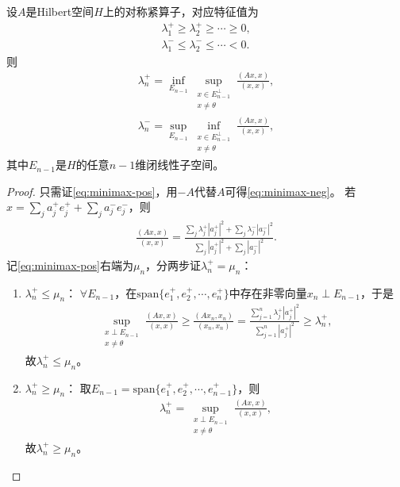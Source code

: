 \documentclass[../../main.tex]{subfiles}%
\begin{document}
\begin{theorem}[极小极大刻画]
设$A$是Hilbert空间$H$上的对称紧算子，对应特征值为
\begin{align*}
\lambda_1^+\geqslant\lambda_2^+\geqslant\cdots\geqslant0,\\
\lambda_1^-\leqslant\lambda_2^-\leqslant\cdots<0.
\end{align*}
则
\begin{align}
\lambda_n^+=\inf_{E_{n-1}}\sup_{\substack{x\in E_{n-1}^\perp\\x\neq\theta}}\frac{(Ax,x)}{(x,x)},\label{eq:minimax-pos}\\
\lambda_n^-=\sup_{E_{n-1}}\inf_{\substack{x\in E_{n-1}^\perp\\x\neq\theta}}\frac{(Ax,x)}{(x,x)},\label{eq:minimax-neg}
\end{align}
其中$E_{n-1}$是$H$的任意$n-1$维闭线性子空间。
\end{theorem}
\begin{proof}
只需证\eqref{eq:minimax-pos}，用$-A$代替$A$可得\eqref{eq:minimax-neg}。
若$\displaystyle x=\sum\limits_{j}a_j^+e_j^++\sum\limits_{j}a_j^-e_j^-$，则
\begin{align*}
\frac{(Ax,x)}{(x,x)}=\frac{\sum\limits_{j}\lambda_j^+|a_j^+|^2+\sum\limits_{j}\lambda_j^-|a_j^-|^2}{\sum\limits_{j}|a_j^+|^2+\sum\limits_{j}|a_j^-|^2}.
\end{align*}
记\eqref{eq:minimax-pos}右端为$\mu_n$，分两步证$\lambda_n^+=\mu_n$：
\begin{enumerate}[(1)]
\item $\lambda_n^+\leqslant\mu_n$：
$\forall E_{n-1}$，在$\mathrm{span}\{e_1^+,e_2^+,\cdots,e_n^+\}$中存在非零向量$x_n\perp E_{n-1}$，于是
\begin{align*}
\sup_{\substack{x\perp E_{n-1}\\x\neq\theta}}\frac{(Ax,x)}{(x,x)}\geqslant\frac{(Ax_n,x_n)}{(x_n,x_n)}=\frac{\sum\limits_{j=1}^{n}\lambda_j^+|a_j^+|^2}{\sum\limits_{j=1}^{n}|a_j^+|^2}\geqslant\lambda_n^+,
\end{align*}
故$\lambda_n^+\leqslant\mu_n$。
\item $\lambda_n^+\geqslant\mu_n$：
取$E_{n-1}=\mathrm{span}\{e_1^+,e_2^+,\cdots,e_{n-1}^+\}$，则
\begin{align*}
\lambda_n^+=\sup_{\substack{x\perp E_{n-1}\\x\neq\theta}}\frac{(Ax,x)}{(x,x)},
\end{align*}
故$\lambda_n^+\geqslant\mu_n$。
\end{enumerate}
\end{proof}
\end{document}
